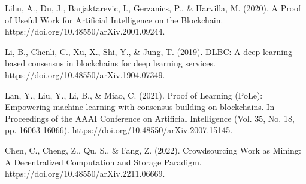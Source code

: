 \documentclass[conference]{IEEEtran}
\begin{document}
\begin{thebibliography}{00}
     Lihu, A., Du, J., Barjaktarevic, I., Gerzanics, P., \& Harvilla, M. (2020). A Proof of Useful Work for Artificial Intelligence on the Blockchain. 
    https://doi.org/10.48550/arXiv.2001.09244.
    
     Li, B., Chenli, C., Xu, X., Shi, Y., \& Jung, T. (2019). DLBC: A deep learning-based consensus in blockchains for deep learning services. 
    https://doi.org/10.48550/arXiv.1904.07349.
    
     Lan, Y., Liu, Y., Li, B., \& Miao, C. (2021). Proof of Learning (PoLe): Empowering machine learning with consensus building on blockchains. In Proceedings of the AAAI Conference on Artificial Intelligence (Vol. 35, No. 18, pp. 16063-16066). 
    https://doi.org/10.48550/arXiv.2007.15145.
    
     Chen, C., Cheng, Z., Qu, S., \& Fang, Z. (2022). Crowdsourcing Work as Mining: A Decentralized Computation and Storage Paradigm. 
    https://doi.org/10.48550/arXiv.2211.06669.
    
    \end{thebibliography}
    
\end{document}
